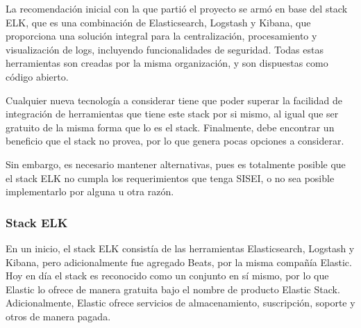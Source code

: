 La recomendación inicial con la que partió el proyecto se armó en base del stack ELK, que es una combinación de Elasticsearch, Logstash y Kibana, que proporciona una solución integral para la centralización, procesamiento y visualización de logs, incluyendo funcionalidades de seguridad. Todas estas herramientas son creadas por la misma organización, y son dispuestas como código abierto.

Cualquier nueva tecnología a considerar tiene que poder superar la facilidad de integración de herramientas que tiene este stack por si mismo, al igual que ser gratuito de la misma forma que lo es el stack. Finalmente, debe encontrar un beneficio que el stack no provea, por lo que genera pocas opciones a considerar.

Sin embargo, es necesario mantener alternativas, pues es totalmente posible que el stack ELK no cumpla los requerimientos que tenga SISEI, o no sea posible implementarlo por alguna u otra razón.

\subsubsection{Stack ELK}

En un inicio, el stack ELK consistía de las herramientas Elasticsearch, Logstash y Kibana, pero adicionalmente fue agregado Beats, por la misma compañía Elastic. Hoy en día el stack es reconocido como un conjunto en sí mismo, por lo que Elastic lo ofrece de manera gratuita bajo el nombre de producto Elastic Stack. Adicionalmente, Elastic ofrece servicios de almacenamiento, suscripción, soporte y otros de manera pagada.

